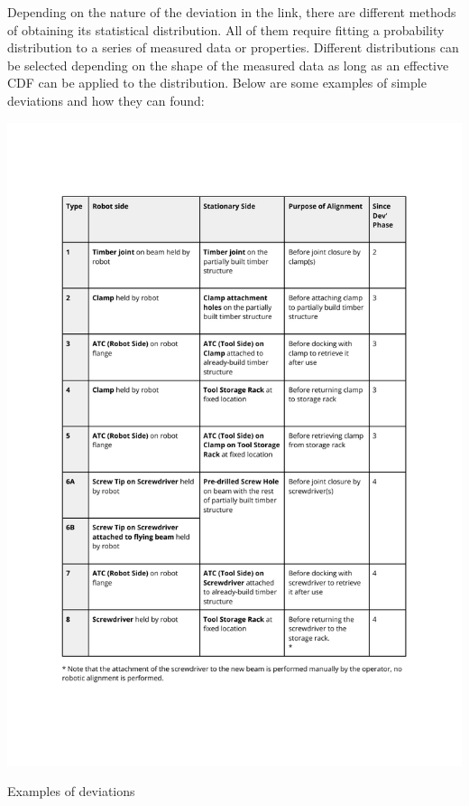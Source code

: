 

Depending on the nature of the deviation in the link, there are different methods of obtaining its statistical distribution. All of them require fitting a probability distribution to a series of measured data or properties. Different distributions can be selected depending on the shape of the measured data as long as an effective CDF can be applied to the distribution. Below are some examples of simple deviations and how they can found:

\begin{table}
    \includegraphics[page=2, trim=25.4mm 130mm 25.4mm 33mm, clip, width=\textwidth]{tables/Tables in Chapter 9 to 11.pdf}
    \caption{Examples of deviations}
\end{table}

\FloatBarrier

